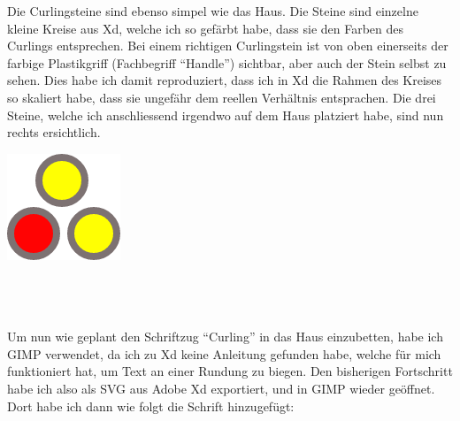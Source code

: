 \documentclass[11pt]{article}
\begin{document}
    \noindent\begin{minipage}{0.6\textwidth}
                 Die Curlingsteine sind ebenso simpel wie das Haus. Die Steine sind einzelne kleine Kreise aus Xd, welche
                 ich so gefärbt habe, dass sie den Farben des Curlings entsprechen. Bei einem richtigen Curlingstein ist
                 von oben einerseits der farbige Plastikgriff (Fachbegriff ``Handle'') sichtbar, aber auch der Stein
                 selbst zu sehen. Dies habe ich damit reproduziert, dass ich in Xd die Rahmen des Kreises so skaliert
                 habe, dass sie ungefähr dem reellen Verhältnis entsprachen. Die drei Steine, welche ich anschliessend
                 irgendwo auf dem Haus platziert habe, sind nun rechts ersichtlich.
    \end{minipage}
    \hfill
    \begin{minipage}[c]{0.3\textwidth}
        \raggedleft
        \includegraphics[width=\linewidth]{media/curling_stones}
    \end{minipage}
    \\\\\\Um nun wie geplant den Schriftzug ``Curling'' in das Haus einzubetten, habe ich GIMP verwendet, da ich zu Xd keine
    Anleitung gefunden habe, welche für mich funktioniert hat, um Text an einer Rundung zu biegen. Den bisherigen
    Fortschritt habe ich also als SVG aus Adobe Xd exportiert, und in GIMP wieder geöffnet.
    Dort habe ich dann wie folgt die Schrift hinzugefügt:
\end{document}

